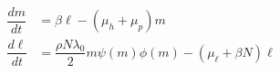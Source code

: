 \documentclass[12pt,a4paper]{article}
\theoremstyle{plain}%
\theoremstyle{definition}
\theoremstyle{remark}
\begin{document}
\begin{align}
\label{model1eq1} \dfrac{dm}{dt}&=\beta \ell - (\mu_h+\mu_p) m\\
\label{model1eq2} \dfrac{d\ell}{dt}&=\dfrac{\rho N \lambda_0}{2} m \psi(m) \phi(m) - (\mu_{\ell}  + \beta N) \ell 
\end{align}
\end{document}
